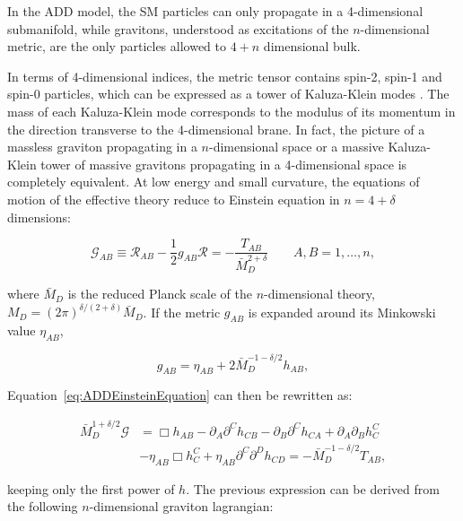 In the ADD model, the SM particles can only propagate in a 4-dimensional submanifold, while gravitons, understood as excitations of the $n$-dimensional metric, are the only particles allowed to $4+n$ dimensional bulk.

In terms of 4-dimensional indices, the metric tensor contains spin-2, spin-1 and spin-0 particles, which can be expressed as a tower of Kaluza-Klein modes \cite{KaluzaArticle,KleinArticle}.
The mass of each Kaluza-Klein mode corresponds to the modulus of its momentum in the direction transverse to the 4-dimensional brane.
In fact, the picture of a massless graviton propagating in a $n$-dimensional space or a massive Kaluza-Klein tower of massive gravitons propagating in a 4-dimensional space is completely equivalent.
At low energy and small curvature, the equations of motion of the effective theory reduce to Einstein equation in $n=4+\delta$ dimensions:

\begin{equation}
\mathcal{G}_{AB} \equiv \mathcal{R}_{AB} - \frac{1}{2} g_{AB}\mathcal{R} = - \frac{T_{AB}}{\bar{M}^{2+\delta}_D} \quad\quad A,B = 1,\ldots,n,
\label{eq:ADDEinsteinEquation}
\end{equation}

\noindent where $\bar{M}_D$ is the reduced Planck scale of the $n$-dimensional theory, $M_D = (2\pi)^{\delta/(2+\delta)} \bar{M}_D$.
If the metric $g_{AB}$ is expanded around its Minkowski value $\eta_{AB}$,

\begin{equation}
g_{AB} = \eta_{AB} + 2 \bar{M}_D^{-1-\delta/2}h_{AB},
\label{eq:ADDMinkowskiExpansion}
\end{equation}

\noindent Equation~\ref{eq:ADDEinsteinEquation} can then be rewritten as:

\begin{equation}
\begin{split}
\bar{M}_D^{1+\delta/2} \mathcal{G} &= \Box h_{AB} - \partial_A \partial^C h_{CB} - \partial_B \partial^C h_{CA} + \partial_A \partial_B h^C_C \\
&- \eta_{AB} \Box h_C^C + \eta_{AB}\partial^C \partial^D h_{CD} = - \bar{M}_D^{-1-\delta/2} T_{AB},
\end{split}
\label{eq:ADDEinsteinEquationPowersH}
\end{equation}

\noindent keeping only the first power of $h$.
The previous expression can be derived from the following $n$-dimensional graviton lagrangian:


